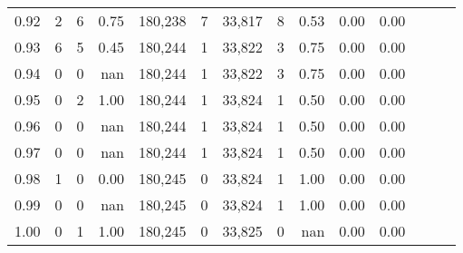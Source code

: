 \begin{tabular}{rrrrrrrrrrrrrr}
0.92 &      2 &      6 &  0.75 &  180,238 &        7 &  33,817 &       8 &  0.53 &  0.00 &      0.00 \\
0.93 &      6 &      5 &  0.45 &  180,244 &        1 &  33,822 &       3 &  0.75 &  0.00 &      0.00 \\
0.94 &      0 &      0 &   nan &  180,244 &        1 &  33,822 &       3 &  0.75 &  0.00 &      0.00 \\
0.95 &      0 &      2 &  1.00 &  180,244 &        1 &  33,824 &       1 &  0.50 &  0.00 &      0.00 \\
0.96 &      0 &      0 &   nan &  180,244 &        1 &  33,824 &       1 &  0.50 &  0.00 &      0.00 \\
0.97 &      0 &      0 &   nan &  180,244 &        1 &  33,824 &       1 &  0.50 &  0.00 &      0.00 \\
0.98 &      1 &      0 &  0.00 &  180,245 &        0 &  33,824 &       1 &  1.00 &  0.00 &      0.00 \\
0.99 &      0 &      0 &   nan &  180,245 &        0 &  33,824 &       1 &  1.00 &  0.00 &      0.00 \\
1.00 &      0 &      1 &  1.00 &  180,245 &        0 &  33,825 &       0 &   nan &  0.00 &      0.00 \\
\bottomrule
\end{tabular}
